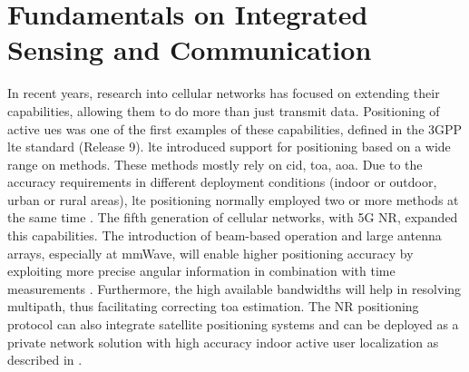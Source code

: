 \chapter{Fundamentals on Integrated Sensing and Communication}
		
		
In recent years, research into cellular networks has focused on extending their capabilities, allowing them to do more than just transmit data.
Positioning of active \glspl{ue} was one of the first examples of these capabilities, defined in the \gls{3GPP} \Gls{lte} standard (Release 9).
\gls{lte} introduced support for positioning based on a wide range on methods.
These methods mostly rely on \gls{cid}, \gls{toa}, \gls{aoa}. Due to the accuracy requirements in different deployment conditions (\ie indoor or outdoor, urban or rural areas), \gls{lte} positioning normally employed two or more methods at the same time \cite{Razavi_Gunnarsson_2018}.
The fifth generation of cellular networks, with 5G \gls{NR}, expanded this capabilities. The introduction of beam-based operation and large antenna arrays, especially at mmWave, will enable higher positioning accuracy by exploiting more precise angular information in combination with time measurements \cite{Keating_Saily_Hulkkonen_Karjalainen_2019}.
Furthermore, the high available bandwidths will help in resolving multipath, thus facilitating correcting \gls{toa} estimation.
The \gls{NR} positioning protocol can also integrate satellite positioning systems and can be deployed as a private network solution with high accuracy indoor active user localization as described in  \cite{Henninger_Abrudan_Mandelli_Arnold_Saur_Kolmonen_Klein_Schlitter_Brink_2022}. 

